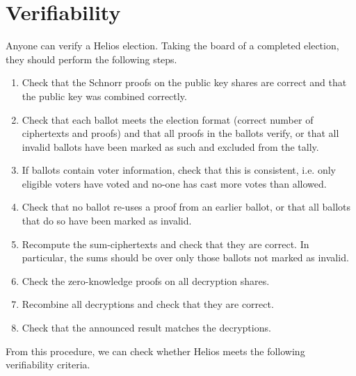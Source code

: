 \documentclass[envcountsame]{llncs}
\begin{document}
\section{Verifiability}

Anyone can verify a Helios election. Taking the board of a completed election,
they should perform the following steps.
\begin{enumerate}
\item Check that the Schnorr proofs on the public key shares are correct and
that the public key was combined correctly.
\item Check that each ballot meets the election format (correct number of
ciphertexts and proofs) and that all proofs in the ballots verify, or that all
invalid ballots have been marked as such and excluded from the tally.
\item If ballots contain voter information, check that this is consistent, i.e.
only eligible voters have voted and no-one has cast more votes than allowed.
\item Check that no ballot re-uses a proof from an earlier ballot, or that all
ballots that do so have been marked as invalid.
\item Recompute the sum-ciphertexts and check that they are correct.
In particular, the sums should be over only those ballots not marked as invalid.
\item Check the zero-knowledge proofs on all decryption shares.
\item Recombine all decryptions and check that they are correct.
\item Check that the announced result matches the decryptions.
\end{enumerate}

From this procedure, we can check whether Helios meets the following
verifiability criteria.
\end{document}
